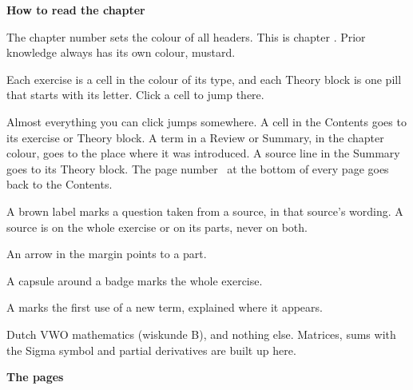 \noindent\textbf{How to read the chapter}\nopagebreak
\begin{description}[style=unboxed,leftmargin=0pt,itemsep=8pt,parsep=0pt]
\item[Colours] The chapter number sets the colour of all headers. This is chapter \thischap. Prior knowledge always has its own colour, mustard.\par\smallskip
\noindent\legchap
\item[Contents] Each exercise is a cell in the colour of its type, and each Theory block is one pill that starts with its letter. Click a
cell to jump there.\par\smallskip
\noindent\mbox{}
\item[Links] Almost everything you can click jumps somewhere. A cell in the Contents goes to its exercise or Theory block. A term in a Review or Summary, in the chapter colour, goes to the place where it was introduced. A source line in the Summary goes to its Theory block. The page number \legpnum\ at the bottom of every page goes back to the Contents.
\item[Source tag] A brown label marks a question taken from a source, in that source's wording. A source is on the whole exercise or on its parts, never on both.\par\smallskip
\noindent\hspace*{\dimexpr\wfix-2pt\relax}\enspace An arrow in the margin points to a part.\par\smallskip
\noindent{}\enspace A capsule around a badge marks the whole exercise.
\item[New term] A  marks the first use of a new term, explained where it appears.
\item[Assumed] Dutch VWO mathematics (wiskunde B), and nothing else. Matrices, sums with the Sigma symbol and partial derivatives are built up here.
\end{description}
\medskip

\noindent\textbf{The pages}\par\smallskip
{}
